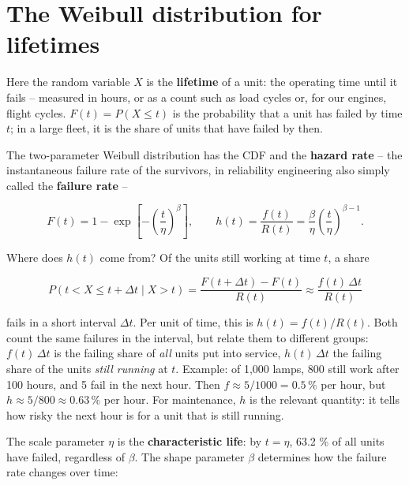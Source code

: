 \documentclass[
  letterpaper,
  DIV=11,
  numbers=noendperiod]{scrreprt}
\begin{document}
\section{The Weibull distribution for
lifetimes}\label{the-weibull-distribution-for-lifetimes}

Here the random variable \(X\) is the \textbf{lifetime} of a unit: the
operating time until it fails -- measured in hours, or as a count such
as load cycles or, for our engines, flight cycles. \(F(t) = P(X \le t)\)
is the probability that a unit has failed by time \(t\); in a large
fleet, it is the share of units that have failed by then.

The two-parameter Weibull distribution has the CDF and the
\textbf{hazard rate} -- the instantaneous failure rate of the survivors,
in reliability engineering also simply called the \textbf{failure rate}
--

\[F(t) = 1 - \exp\left[-\left(\frac{t}{\eta}\right)^{\beta}\right], \qquad h(t) = \frac{f(t)}{R(t)} = \frac{\beta}{\eta}\left(\frac{t}{\eta}\right)^{\beta - 1}.\]

Where does \(h(t)\) come from? Of the units still working at time \(t\),
a share

\[P(t < X \le t + \Delta t \mid X > t) = \frac{F(t + \Delta t) - F(t)}{R(t)} \approx \frac{f(t)\,\Delta t}{R(t)}\]

fails in a short interval \(\Delta t\). Per unit of time, this is
\(h(t) = f(t)/R(t)\). Both count the same failures in the interval, but
relate them to different groups: \(f(t)\,\Delta t\) is the failing share
of \emph{all} units put into service, \(h(t)\,\Delta t\) the failing
share of the units \emph{still running} at \(t\). Example: of 1,000
lamps, 800 still work after 100 hours, and 5 fail in the next hour. Then
\(f \approx 5/1000 = 0.5\,\%\) per hour, but
\(h \approx 5/800 \approx 0.63\,\%\) per hour. For maintenance, \(h\) is
the relevant quantity: it tells how risky the next hour is for a unit
that is still running.

The scale parameter \(\eta\) is the \textbf{characteristic life}: by
\(t = \eta\), 63.2 \% of all units have failed, regardless of \(\beta\).
The shape parameter \(\beta\) determines how the failure rate changes
over time:
\end{document}
